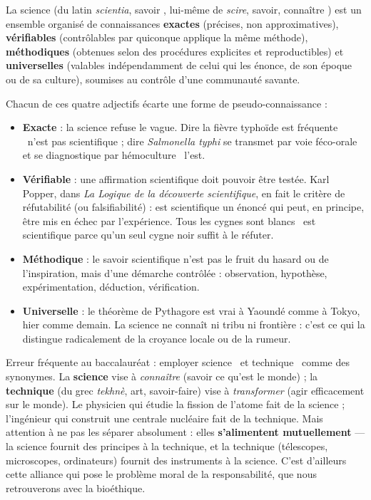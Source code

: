 \documentclass[11pt]{article}
\newcommand{\cle}[1]{{\popxbold\color{popdark}#1}}
\begin{document}
\begin{definition}[La science]
La \cle{science} (du latin \emph{scientia}, \guillemotleft savoir \guillemotright, lui-même de \emph{scire}, \guillemotleft savoir, connaître \guillemotright) est un ensemble organisé de connaissances \textbf{exactes} (précises, non approximatives), \textbf{vérifiables} (contrôlables par quiconque applique la même méthode), \textbf{méthodiques} (obtenues selon des procédures explicites et reproductibles) et \textbf{universelles} (valables indépendamment de celui qui les énonce, de son époque ou de sa culture), soumises au contrôle d'une communauté savante.
\end{definition}

Chacun de ces quatre adjectifs écarte une forme de pseudo-connaissance :

\begin{itemize}
\item \textbf{Exacte} : la science refuse le vague. Dire \guillemotleft la fièvre typhoïde est fréquente \guillemotright\ n'est pas scientifique ; dire \guillemotleft \emph{Salmonella typhi} se transmet par voie féco-orale et se diagnostique par hémoculture \guillemotright\ l'est.
\item \textbf{Vérifiable} : une affirmation scientifique doit pouvoir être testée. Karl Popper, dans \emph{La Logique de la découverte scientifique}, en fait le critère de \cle{réfutabilité} (ou falsifiabilité) : est scientifique un énoncé qui peut, en principe, être mis en échec par l'expérience. \guillemotleft Tous les cygnes sont blancs \guillemotright\ est scientifique parce qu'un seul cygne noir suffit à le réfuter.
\item \textbf{Méthodique} : le savoir scientifique n'est pas le fruit du hasard ou de l'inspiration, mais d'une démarche contrôlée : observation, hypothèse, expérimentation, déduction, vérification.
\item \textbf{Universelle} : le théorème de Pythagore est vrai à Yaoundé comme à Tokyo, hier comme demain. La science ne connaît ni tribu ni frontière : c'est ce qui la distingue radicalement de la croyance locale ou de la rumeur.
\end{itemize}

\begin{attention}
Erreur fréquente au baccalauréat : employer \guillemotleft science \guillemotright\ et \guillemotleft technique \guillemotright\ comme des synonymes. La \textbf{science} vise à \emph{connaître} (savoir ce qu'est le monde) ; la \textbf{technique} (du grec \emph{tekhnè}, art, savoir-faire) vise à \emph{transformer} (agir efficacement sur le monde). Le physicien qui étudie la fission de l'atome fait de la science ; l'ingénieur qui construit une centrale nucléaire fait de la technique. Mais attention à ne pas les séparer absolument : elles \textbf{s'alimentent mutuellement} — la science fournit des principes à la technique, et la technique (télescopes, microscopes, ordinateurs) fournit des instruments à la science. C'est d'ailleurs cette alliance qui pose le problème moral de la responsabilité, que nous retrouverons avec la bioéthique.
\end{attention}
\end{document}
